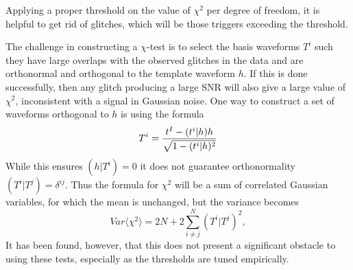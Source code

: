 \documentclass[binding=0.6cm, LaM]{sapthesis}
\begin{document}
	Applying a proper threshold on the value of $\chi^2$ per degree of freedom, 
	it is helpful to get rid of glitches, which will be those triggers exceeding the threshold.

	The challenge in constructing a $\chi$-test is to select the basis waveforms $T^i$ 	
	such they have large overlaps with the observed glitches in the data and 
	are orthonormal and orthogonal to the template waveform $h$. 
	If this is done successfully, then any glitch producing a large SNR will also give a large value of $\chi^2$, 
	inconsistent with a signal in Gaussian noise. 
	One way to construct a set of waveforms orthogonal to $h$ is using the formula
        \begin{equation}
          T^i = {{t^I-(t^i|h)h} \over {\sqrt{1-(t^i|h)^2}}}
        \end{equation}
	While this ensures $(h|T^i) = 0$ it does not guarantee orthonormality $(T^i|T^j)=\delta^{ij}$. 
	Thus the formula for $\chi^2$ will be a sum of correlated Gaussian variables, 
	for which the mean is unchanged, but the variance becomes
        \begin{equation}
          Var\langle \chi^2 \rangle=2N+ 2\sum^N_{i \neq j}(T^i|T^j)^2, 
        \end{equation}
	It has been found, however, that this does not present a significant obstacle to using these tests, 	
	especially as the thresholds are tuned empirically.
 
\end{document}

